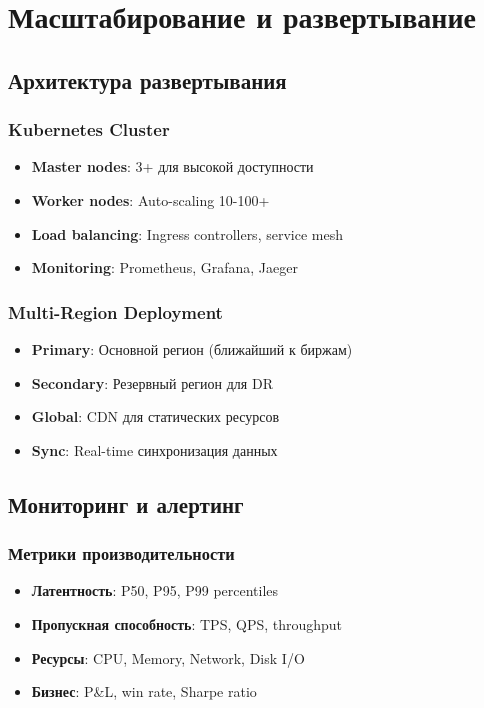 \documentclass[12pt,a4paper]{article}
\begin{document}
\section{Масштабирование и развертывание}

\subsection{Архитектура развертывания}

\subsubsection{Kubernetes Cluster}
\begin{itemize}
    \item \textbf{Master nodes}: 3+ для высокой доступности
    \item \textbf{Worker nodes}: Auto-scaling 10-100+
    \item \textbf{Load balancing}: Ingress controllers, service mesh
    \item \textbf{Monitoring}: Prometheus, Grafana, Jaeger
\end{itemize}

\subsubsection{Multi-Region Deployment}
\begin{itemize}
    \item \textbf{Primary}: Основной регион (ближайший к биржам)
    \item \textbf{Secondary}: Резервный регион для DR
    \item \textbf{Global}: CDN для статических ресурсов
    \item \textbf{Sync}: Real-time синхронизация данных
\end{itemize}

\subsection{Мониторинг и алертинг}

\subsubsection{Метрики производительности}
\begin{itemize}
    \item \textbf{Латентность}: P50, P95, P99 percentiles
    \item \textbf{Пропускная способность}: TPS, QPS, throughput
    \item \textbf{Ресурсы}: CPU, Memory, Network, Disk I/O
    \item \textbf{Бизнес}: P&L, win rate, Sharpe ratio
\end{itemize}
\end{document}
